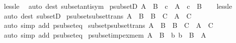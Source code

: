 \begin{isabellebody}
\isamarkupfalse%
\ less{\isacharunderscore}{\kern0pt}le\ \isamarkupfalse%
\ {\isacharparenleft}{\kern0pt}auto\ dest{\isacharcolon}{\kern0pt}\ subset{\isacharunderscore}{\kern0pt}antisym{\isacharparenright}{\kern0pt}%
\endisatagproof
{\isafoldproof}%
%
\isadelimproof
\isanewline
%
\endisadelimproof
\isanewline
{}\isamarkupfalse%
\ psubsetD{\isacharcolon}{\kern0pt}\ {\isachardoublequoteopen}A\ {\isasymsubset}\ B\ {\isasymLongrightarrow}\ c\ {\isasymin}\ A\ {\isasymLongrightarrow}\ c\ {\isasymin}\ B{\isachardoublequoteclose}\isanewline
%
\isadelimproof
\ \ %
\endisadelimproof
%
\isatagproof
{}\isamarkupfalse%
\ less{\isacharunderscore}{\kern0pt}le\ \isamarkupfalse%
\ {\isacharparenleft}{\kern0pt}auto\ dest{\isacharcolon}{\kern0pt}\ subsetD{\isacharparenright}{\kern0pt}%
\endisatagproof
{\isafoldproof}%
%
\isadelimproof
\isanewline
%
\endisadelimproof
\isanewline
{}\isamarkupfalse%
\ psubset{\isacharunderscore}{\kern0pt}subset{\isacharunderscore}{\kern0pt}trans{\isacharcolon}{\kern0pt}\ {\isachardoublequoteopen}A\ {\isasymsubset}\ B\ {\isasymLongrightarrow}\ B\ {\isasymsubseteq}\ C\ {\isasymLongrightarrow}\ A\ {\isasymsubset}\ C{\isachardoublequoteclose}\isanewline
%
\isadelimproof
\ \ %
\endisadelimproof
%
\isatagproof
{}\isamarkupfalse%
\ {\isacharparenleft}{\kern0pt}auto\ simp\ add{\isacharcolon}{\kern0pt}\ psubset{\isacharunderscore}{\kern0pt}eq{\isacharparenright}{\kern0pt}%
\endisatagproof
{\isafoldproof}%
%
\isadelimproof
\isanewline
%
\endisadelimproof
\isanewline
{}\isamarkupfalse%
\ subset{\isacharunderscore}{\kern0pt}psubset{\isacharunderscore}{\kern0pt}trans{\isacharcolon}{\kern0pt}\ {\isachardoublequoteopen}A\ {\isasymsubseteq}\ B\ {\isasymLongrightarrow}\ B\ {\isasymsubset}\ C\ {\isasymLongrightarrow}\ A\ {\isasymsubset}\ C{\isachardoublequoteclose}\isanewline
%
\isadelimproof
\ \ %
\endisadelimproof
%
\isatagproof
{}\isamarkupfalse%
\ {\isacharparenleft}{\kern0pt}auto\ simp\ add{\isacharcolon}{\kern0pt}\ psubset{\isacharunderscore}{\kern0pt}eq{\isacharparenright}{\kern0pt}%
\endisatagproof
{\isafoldproof}%
%
\isadelimproof
\isanewline
%
\endisadelimproof
\isanewline
{}\isamarkupfalse%
\ psubset{\isacharunderscore}{\kern0pt}imp{\isacharunderscore}{\kern0pt}ex{\isacharunderscore}{\kern0pt}mem{\isacharcolon}{\kern0pt}\ {\isachardoublequoteopen}A\ {\isasymsubset}\ B\ {\isasymLongrightarrow}\ {\isasymexists}b{\isachardot}{\kern0pt}\ b\ {\isasymin}\ B\ {\isacharminus}{\kern0pt}\ A{\isachardoublequoteclose}\isanewline

\end{isabellebody}
